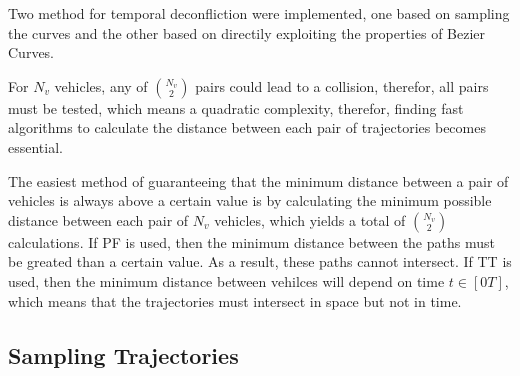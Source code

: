 \par Two method for temporal deconfliction were implemented, one based on sampling the curves and the other based on directily exploiting the properties of Bezier Curves.

\par For $N_v$ vehicles, any of ${N_v \choose 2}$ pairs could lead to a collision, therefor, all pairs must be tested, which means a quadratic complexity, therefor, finding fast algorithms to calculate the distance between each pair of trajectories becomes essential.
\par The easiest method of guaranteeing that the minimum distance between a pair of vehicles is always above a certain value is by calculating the minimum possible distance between each pair of $N_v$ vehicles, which yields a total of ${N_v \choose 2}$ calculations. If \ac{PF} is used, then the minimum distance between the paths must be greated than a certain value. As a result, these paths cannot intersect. If \ac{TT} is used, then the minimum distance between vehilces will depend on time $t \in [0 T]$, which means that the trajectories must intersect in space but not in time. 

\subsection{Sampling Trajectories}


